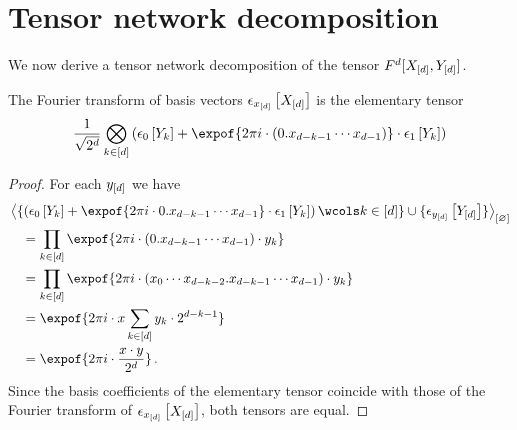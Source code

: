 \section{Tensor network decomposition}

We now derive a tensor network decomposition of the tensor $F^{d}[X_{[d]},Y_{[d]}]$.


\begin{lemma}
    The Fourier transform of basis vectors $\epsilon_{x_{[d]}}\left[X_{[d]}\right]$ is the elementary tensor
    \begin{align*}
        \frac{1}{\sqrt{2^{\catorder}}} \bigotimes_{\catenumeratorin} \left( \fbasisat{\headvariableof{\catenumerator}} + \expof{2\pi i \cdot (0.\catindexof{\catorder-\catenumerator-1}\cdots\catindexof{\catorder-1})}\cdot \tbasisat{\headvariableof{\catenumerator}}\right)
    \end{align*}
\end{lemma}
\begin{proof}
    For each $y_{[d]}$ we have
    \begin{align*}
        &\contraction{
            \{ \left( \fbasisat{\headvariableof{\catenumerator}} + \expof{2\pi i \cdot 0.\catindexof{\catorder-\catenumerator-1}\cdots\catindexof{\catorder-1}}\cdot \tbasisat{\headvariableof{\catenumerator}}\right) \wcols \catenumeratorin\}
            \cup \{\onehotmapofat{\headindexof{[\catorder]}}{\headvariableof{[\catorder]}}\}
        } \\
        &\quad= \prod_{\catenumeratorin} \expof{2\pi i \cdot (0.\catindexof{\catorder-\catenumerator-1}\cdots\catindexof{\catorder-1}) \cdot \headindexof{\catenumerator}} \\
        &\quad= \prod_{\catenumeratorin} \expof{2\pi i \cdot (\catindexof{0}\cdots\catindexof{\catorder-\catenumerator-2}.\catindexof{\catorder-\catenumerator-1}\cdots\catindexof{\catorder-1}) \cdot \headindexof{\catenumerator}} \\
        &\quad= \expof{2\pi i \cdot \catindex \sum_{\catenumeratorin} \headindexof{\catenumerator} \cdot 2^{\catorder-\catenumerator-1}} \\
        &\quad= \expof{2\pi i \cdot  \frac{\catindex\cdot\headindex}{2^{\catorder}}} \, .
    \end{align*}
    Since the basis coefficients of the elementary tensor coincide with those of the Fourier transform of $\epsilon_{x_{[d]}}\left[X_{[d]}\right]$, both tensors are equal.
\end{proof}


